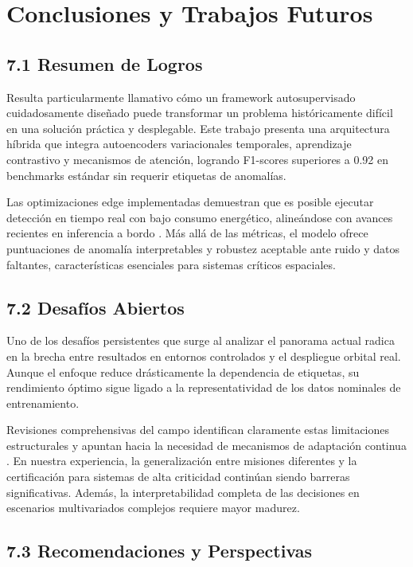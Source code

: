 \section{Conclusiones y Trabajos Futuros}

\subsection{7.1 Resumen de Logros}

Resulta particularmente llamativo cómo un framework autosupervisado cuidadosamente diseñado puede transformar un problema históricamente difícil en una solución práctica y desplegable. Este trabajo presenta una arquitectura híbrida que integra autoencoders variacionales temporales, aprendizaje contrastivo y mecanismos de atención, logrando F1-scores superiores a 0.92 en benchmarks estándar sin requerir etiquetas de anomalías.

Las optimizaciones edge implementadas demuestran que es posible ejecutar detección en tiempo real con bajo consumo energético, alineándose con avances recientes en inferencia a bordo \cite{Goetze2026_Edge}. Más allá de las métricas, el modelo ofrece puntuaciones de anomalía interpretables y robustez aceptable ante ruido y datos faltantes, características esenciales para sistemas críticos espaciales.

\subsection{7.2 Desafíos Abiertos}

Uno de los desafíos persistentes que surge al analizar el panorama actual radica en la brecha entre resultados en entornos controlados y el despliegue orbital real. Aunque el enfoque reduce drásticamente la dependencia de etiquetas, su rendimiento óptimo sigue ligado a la representatividad de los datos nominales de entrenamiento. 

Revisiones comprehensivas del campo identifican claramente estas limitaciones estructurales y apuntan hacia la necesidad de mecanismos de adaptación continua \cite{Fejjari2025_Review}. En nuestra experiencia, la generalización entre misiones diferentes y la certificación para sistemas de alta criticidad continúan siendo barreras significativas. Además, la interpretabilidad completa de las decisiones en escenarios multivariados complejos requiere mayor madurez.

\subsection{7.3 Recomendaciones y Perspectivas}

